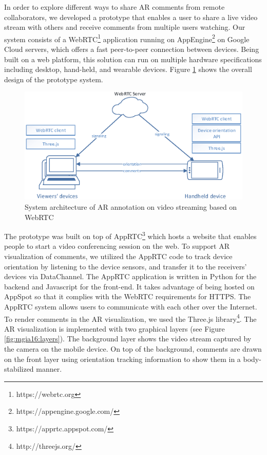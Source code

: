 In order to explore different ways to share AR comments from remote collaborators, we developed a prototype that enables a user to share a live video stream with others and receive comments from multiple users watching. Our system consists of a WebRTC\footnote{https://webrtc.org} application running on AppEngine\footnote{https://appengine.google.com/} on Google Cloud servers, which offers a fast peer-to-peer connection between devices. Being built on a web platform, this solution can run on multiple hardware specifications including desktop, hand-held, and wearable devices. Figure \ref{fig:mgia16:system} shows the overall design of the prototype system.

\begin{figure}[ht]
  \centering
  \includegraphics[width=\linewidth]{images/mgia16/system}
  \caption{System architecture of AR annotation on video streaming based on WebRTC}
	\label{fig:mgia16:system}
\end{figure}

The prototype was built on top of AppRTC\footnote{https://apprtc.appspot.com/} which hosts a website that enables people to start a video conferencing session on the web. To support AR visualization of comments, we utilized the AppRTC code to track device orientation by listening to the device sensors, and transfer it to the receivers’ devices via DataChannel. The AppRTC application is written in Python for the backend and Javascript for the front-end. It takes advantage of being hosted on AppSpot so that it complies with the WebRTC requirements for HTTPS. The AppRTC system allows users to communicate with each other over the Internet. To render comments in the AR visualization, we used the Three.js library\footnote{http://threejs.org/}. The AR visualization is implemented with two graphical layers (see Figure \ref{fig:mgia16:layers}). The background layer shows the video stream captured by the camera on the mobile device. On top of the background, comments are drawn on the front layer using orientation tracking information to show them in a body-stabilized manner. 


